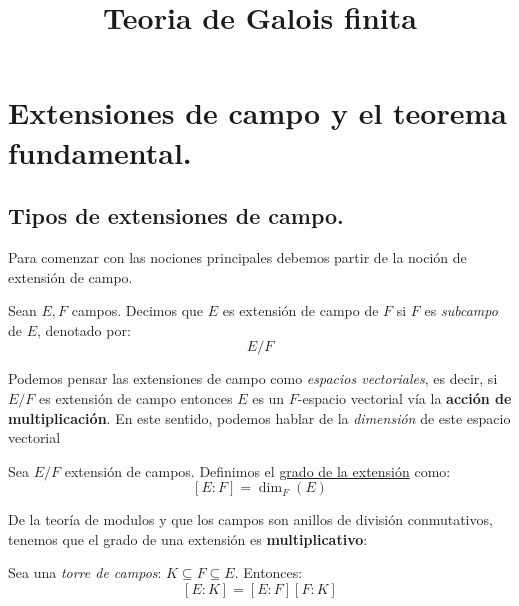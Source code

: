 \documentclass{notas}
\title{Teoria de Galois finita}
\begin{document}
\maketitle

\chapter{Extensiones de campo y el teorema fundamental.}
\section{Tipos de extensiones de campo.}

Para comenzar con las nociones principales debemos partir de la noción de extensión de campo.

\begin{tcolorbox}[title=Definición]
	Sean $E,F$ campos. Decimos que $E$ es extensión de campo de $F$ si $F$ es \textit{subcampo} de $E$, denotado por: $$E/F$$
\end{tcolorbox}

Podemos pensar las extensiones de campo como \textit{espacios vectoriales}, es decir, si $E/F$ es extensión de campo entonces $E$ es un $F$-espacio vectorial vía la \textbf{acción de multiplicación}.
En este sentido, podemos hablar de la \textit{dimensión} de este espacio vectorial

\begin{tcolorbox}[title=Grado de una extensión]
	Sea $E/F$ extensión de campos. Definimos el \underline{grado de la extensión} como:$$[E:F]=\dim_F(E)$$
\end{tcolorbox}

De la teoría de modulos y que los campos son anillos de división conmutativos, tenemos que el grado de una extensión es \textbf{multiplicativo}:

\begin{tcolorbox}[title=Propiedad multiplicativa del grado]
	Sea una \textit{torre de campos}: $K\subseteq F\subseteq E$. Entonces: $$[E:K]=[E:F][F:K]$$ 
\end{tcolorbox}
\end{document}
